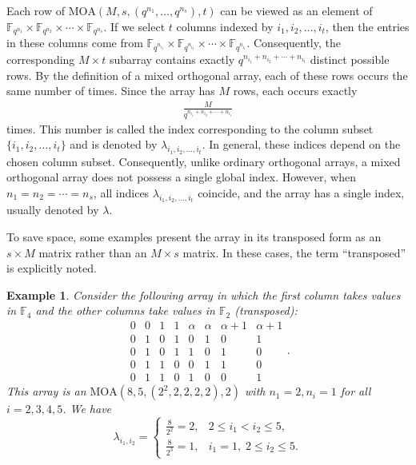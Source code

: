 \documentclass[11pt]{article}
\newtheorem{Example}[Theorem]{Example}
\newtheorem{Definition and Notation}[Theorem]{Definition and Notation}
\begin{document}
Each row of $\mathrm{MOA}(M, s, (q^{n_1},\dots, q^{n_s}), t)$ can  be viewed as an element of $\mathbb{F}_{q^{n_1}} \times \mathbb{F}_{q^{n_2}} \times \cdots \times \mathbb{F}_{q^{n_s}}$.
If we select $t$ columns indexed by $i_1, i_2, \ldots, i_t$, then the entries in these columns come from $\mathbb{F}_{q^{n_{i_1}}} \times \mathbb{F}_{q^{n_{i_2}}} \times \cdots \times \mathbb{F}_{q^{n_{i_t}}}$.  Consequently, the corresponding $M\times t$ subarray contains exactly  $q^{n_{i_1}+n_{i_2}+\cdots+n_{i_t}}$ distinct possible rows. By the definition of a mixed orthogonal array, each of these rows occurs the same number of times. Since the array has $M$ rows, each occurs exactly
\begin{align}\label{index}
\frac{M}{q^{n_{i_1}+n_{i_2}+\cdots+n_{i_t}}}
\end{align}
times. This number is called the index corresponding to the column subset $\{i_1,i_2,\ldots,i_t\}$ and is denoted by $\lambda_{i_1,i_2,\ldots,i_t}$. In general, these indices depend on the chosen column subset. Consequently, unlike ordinary orthogonal arrays, a mixed orthogonal array does not possess a single global index. However, when $n_1=n_2=\cdots=n_s$, all indices $\lambda_{i_1,i_2,\ldots,i_t}$ coincide, and the array has a single index, usually denoted by $\lambda$.

To save space, some examples present the array in its transposed form as an $s \times M$ matrix rather than an $M \times s$ matrix. In these cases, the term ``transposed'' is explicitly noted.

\begin{Example}\label{e1}
Consider the following array in which  the first  column takes values in $\mathbb F_4$ and the other columns take values in $\mathbb F_2$ (transposed):
$$
\begin{array}{cccccccc}
0 & 0 & 1 & 1 & \alpha & \alpha & \alpha+1 & \alpha+1 \\
0 & 1 & 0 & 1 & 0 & 1 & 0 & 1 \\
0 & 1 & 0 & 1 & 1 & 0 & 1 & 0 \\
0 & 1 & 1 & 0 & 0 & 1 & 1 & 0 \\
0 & 1 & 1 & 0 & 1 & 0 & 0 & 1
\end{array}.
$$
This array is an $\mathrm{MOA}(8,5,(2^2,2,2,2,2),2)$ with $n_1=2, n_i=1$ for all $i=2,3,4,5$. We have 
$$
\lambda_{i_1,i_2}=
\begin{cases}
\frac{8}{2^2}=2, & 2\le i_1<i_2\le5,\\[4pt]
\frac{8}{2^3}=1, & i_1=1,\; 2\le i_2\le5 .
\end{cases}
$$
\end{Example}
\end{document}
